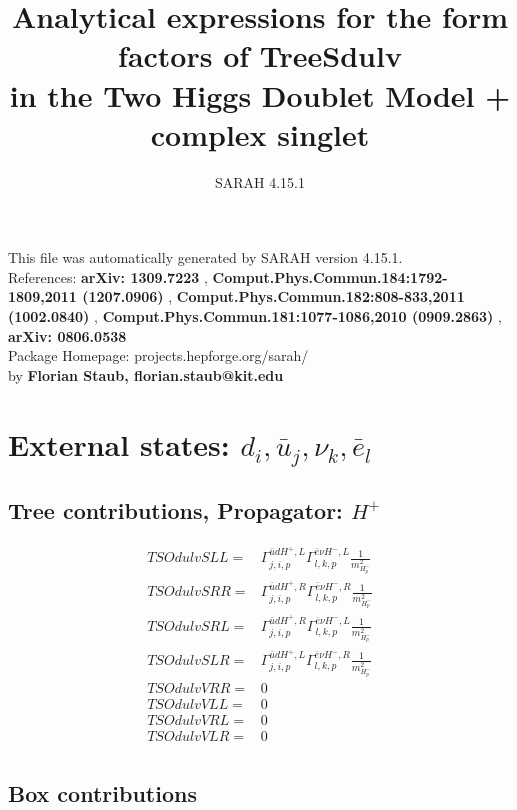 \documentclass[A4,landscape]{article}
\begin{document}
\title{Analytical expressions for the form factors of TreeSdulv\\ in the Two Higgs Doublet Model + complex singlet } 
 \author{SARAH 4.15.1} 
 \maketitle 
 \vspace{10cm} 
This file was automatically generated by SARAH version 4.15.1.  \\ 
References: {\bf arXiv: 1309.7223 }, {\bf Comput.Phys.Commun.184:1792-1809,2011 (1207.0906) }, {\bf Comput.Phys.Commun.182:808-833,2011 (1002.0840) }, {\bf Comput.Phys.Commun.181:1077-1086,2010 (0909.2863) }, {\bf arXiv: 0806.0538 } \\ 
Package Homepage: projects.hepforge.org/sarah/ \\ 
by {\bf Florian Staub, florian.staub@kit.edu} 
 \pagebreak 
 \tableofcontents 
 \pagebreak 
\section{External states: ${d_{{i}}, \bar{u}_{{j}}, \nu_{{k}}, \bar{e}_{{l}}}$} 
\subsection{Tree contributions, Propagator: $H^+$} 

\begin{align} 
  TSOdulvSLL= & \Gamma^{\bar{u}d H^+,L}_{j, i, p} \Gamma^{\bar{e}\nu H^- ,L}_{l, k, p} \frac{1}{m^2_{H^-_{{p}}}} \\ 
  TSOdulvSRR= & \Gamma^{\bar{u}d H^+,R}_{j, i, p} \Gamma^{\bar{e}\nu H^- ,R}_{l, k, p} \frac{1}{m^2_{H^-_{{p}}}} \\ 
  TSOdulvSRL= & \Gamma^{\bar{u}d H^+,R}_{j, i, p} \Gamma^{\bar{e}\nu H^- ,L}_{l, k, p} \frac{1}{m^2_{H^-_{{p}}}} \\ 
  TSOdulvSLR= & \Gamma^{\bar{u}d H^+,L}_{j, i, p} \Gamma^{\bar{e}\nu H^- ,R}_{l, k, p} \frac{1}{m^2_{H^-_{{p}}}} \\ 
  TSOdulvVRR= & 0 \\ 
  TSOdulvVLL= & 0 \\ 
  TSOdulvVRL= & 0 \\ 
  TSOdulvVLR= & 0 \\ 
\end{align} 
\subsection{Box contributions} 
\end{document}
